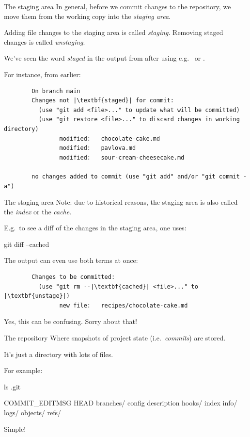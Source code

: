 \documentclass{git_course}
\begin{document}
\begin{frame}[fragile]{The staging area}
    In general, before we commit changes to the repository, we move them
    from the working copy into the \emph{staging area}.

    Adding file changes to the staging area is called \emph{staging}.
    Removing staged changes is called \emph{unstaging}.

    We've seen the word \emph{staged} in the output from 
    after using e.g.\  or .

    For instance, from earlier:
    \begin{verbatim}
        On branch main
        Changes not |\textbf{staged}| for commit:
          (use "git add <file>..." to update what will be committed)
          (use "git restore <file>..." to discard changes in working directory)
                modified:   chocolate-cake.md
                modified:   pavlova.md
                modified:   sour-cream-cheesecake.md

        no changes added to commit (use "git add" and/or "git commit -a")
    \end{verbatim}
\end{frame}

\begin{frame}[fragile]{The staging area}
    Note: due to historical reasons, the staging area is also called the
    \emph{index} or the \emph{cache}.

    E.g.\ to see a diff of the changes in the staging area, one uses:
    \begin{shellcode}
        git diff --cached
    \end{shellcode}

    The  output can even use both terms at once:
    \begin{verbatim}
        Changes to be committed:
          (use "git rm --|\textbf{cached}| <file>..." to |\textbf{unstage}|)
                new file:   recipes/chocolate-cake.md
    \end{verbatim}

    Yes, this can be confusing.    Sorry about that!
\end{frame}

\begin{frame}[fragile]{The repository}
    Where snapshots of project state (i.e.\ \emph{commits}) are stored.

    It's just a directory with lots of files.

    For example:
    \begin{shellcode}
        ls .git
    \end{shellcode}
    \begin{outputcode}
COMMIT_EDITMSG
HEAD
branches/
config
description
hooks/
index
info/
logs/
objects/
refs/
    \end{outputcode}

    Simple!
\end{frame}
\end{document}
